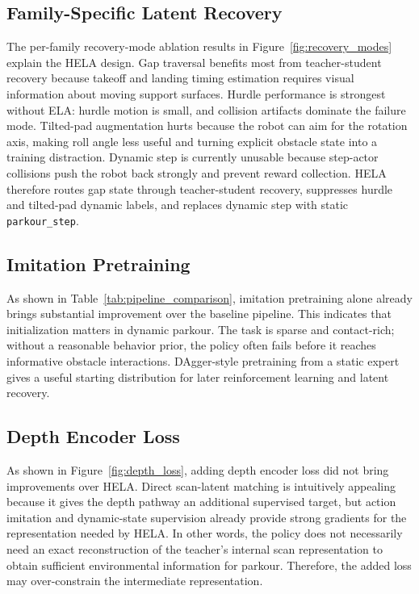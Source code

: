 \documentclass[conference]{IEEEtran}
\begin{document}
\subsection{Family-Specific Latent Recovery}
The per-family recovery-mode ablation results in Figure~\ref{fig:recovery_modes} explain the HELA design. Gap traversal benefits most from teacher-student recovery because takeoff and landing timing estimation requires visual information about moving support surfaces. Hurdle performance is strongest without ELA: hurdle motion is small, and collision artifacts dominate the failure mode. Tilted-pad augmentation hurts because the robot can aim for the rotation axis, making roll angle less useful and turning explicit obstacle state into a training distraction. Dynamic step is currently unusable because step-actor collisions push the robot back strongly and prevent reward collection. HELA therefore routes gap state through teacher-student recovery, suppresses hurdle and tilted-pad dynamic labels, and replaces dynamic step with static \texttt{parkour\_\allowbreak step}.

\subsection{Imitation Pretraining}
As shown in Table~\ref{tab:pipeline_comparison}, imitation pretraining alone already brings substantial improvement over the baseline pipeline. This indicates that initialization matters in dynamic parkour. The task is sparse and contact-rich; without a reasonable behavior prior, the policy often fails before it reaches informative obstacle interactions. DAgger-style pretraining from a static expert gives a useful starting distribution for later reinforcement learning and latent recovery.

\subsection{Depth Encoder Loss}
As shown in Figure~\ref{fig:depth_loss}, adding depth encoder loss did not bring improvements over HELA. Direct scan-latent matching is intuitively appealing because it gives the depth pathway an additional supervised target, but action imitation and dynamic-state supervision already provide strong gradients for the representation needed by HELA. In other words, the policy does not necessarily need an exact reconstruction of the teacher's internal scan representation to obtain sufficient environmental information for parkour. Therefore, the added loss may over-constrain the intermediate representation.
\end{document}
